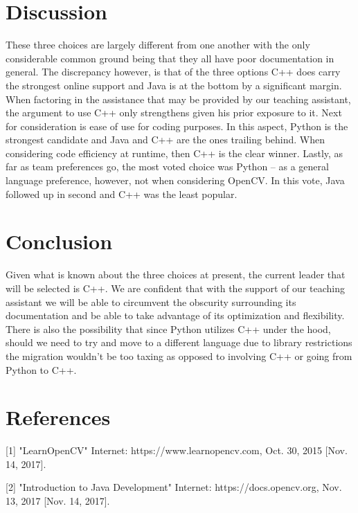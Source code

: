 \documentclass[onecolumn, draftclsnofoot,10pt, compsoc]{IEEEtran}
\begin{document}
\section{Discussion}
These three choices are largely different from one another with the only considerable common ground being that they all have poor documentation in general. The discrepancy however, is that of the three options C++ does carry the strongest online support and Java is at the bottom by a significant margin. When factoring in the assistance that may be provided by our teaching assistant, the argument to use C++ only strengthens given his prior exposure to it. Next for consideration is ease of use for coding purposes. In this aspect, Python is the strongest candidate and Java and C++ are the ones trailing behind. When considering code efficiency at runtime, then C++ is the clear winner. Lastly, as far as team preferences go, the most voted choice was Python – as a general language preference, however, not when considering OpenCV. In this vote, Java followed up in second and C++ was the least popular. 

\section{Conclusion}
Given what is known about the three choices at present, the current leader that will be selected is C++. We are confident that with the support of our teaching assistant we will be able to circumvent the obscurity surrounding its documentation and be able to take advantage of its optimization and flexibility. There is also the possibility that since Python utilizes C++ under the hood, should we need to try and move to a different language due to library restrictions the migration wouldn’t be too taxing as opposed to involving C++ or going from Python to C++. 

\section{References}
[1] "LearnOpenCV" Internet: https://www.learnopencv.com, Oct. 30, 2015 [Nov. 14, 2017].

[2] "Introduction to Java Development" Internet: https://docs.opencv.org, Nov. 13, 2017 [Nov. 14, 2017].
\end{document}
